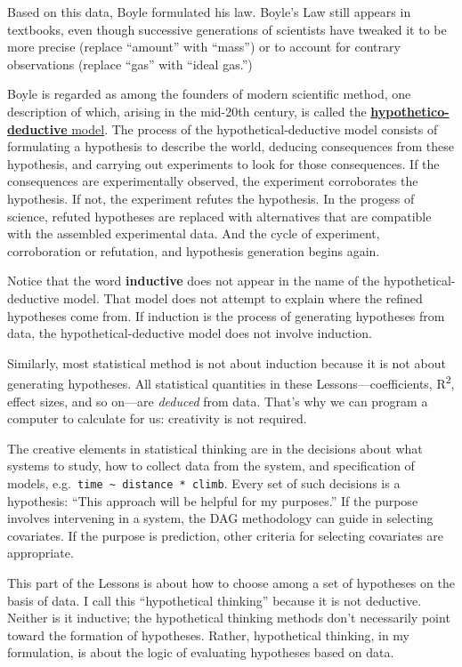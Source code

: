 \documentclass[
  letterpaper,
  DIV=11,
  numbers=noendperiod,
  oneside]{scrartcl}
\begin{document}
Based on this data, Boyle formulated his law. Boyle's Law still appears
in textbooks, even though successive generations of scientists have
tweaked it to be more precise (replace ``amount'' with ``mass'') or to
account for contrary observations (replace ``gas'' with ``ideal gas.'')

Boyle is regarded as among the founders of modern scientific method, one
description of which, arising in the mid-20th century, is called the
\href{https://en.wikipedia.org/wiki/Hypothetico-deductive_model}{\textbf{hypothetico-deductive}
model}. The process of the hypothetical-deductive model consists of
formulating a hypothesis to describe the world, deducing consequences
from these hypothesis, and carrying out experiments to look for those
consequences. If the consequences are experimentally observed, the
experiment corroborates the hypothesis. If not, the experiment refutes
the hypothesis. In the progess of science, refuted hypotheses are
replaced with alternatives that are compatible with the assembled
experimental data. And the cycle of experiment, corroboration or
refutation, and hypothesis generation begins again.

Notice that the word \textbf{inductive} does not appear in the name of
the hypothetical-deductive model. That model does not attempt to explain
where the refined hypotheses come from. If induction is the process of
generating hypotheses from data, the hypothetical-deductive model does
not involve induction.

Similarly, most statistical method is not about induction because it is
not about generating hypotheses. All statistical quantities in these
Lessons---coefficients, R\textsuperscript{2}, effect sizes, and so
on---are \emph{deduced} from data. That's why we can program a computer
to calculate for us: creativity is not required.

The creative elements in statistical thinking are in the decisions about
what systems to study, how to collect data from the system, and
specification of models,
e.g.~\texttt{time\ \textasciitilde{}\ distance\ *\ climb}. Every set of
such decisions is a hypothesis: ``This approach will be helpful for my
purposes.'' If the purpose involves intervening in a system, the DAG
methodology can guide in selecting covariates. If the purpose is
prediction, other criteria for selecting covariates are appropriate.

This part of the Lessons is about how to choose among a set of
hypotheses on the basis of data. I call this ``hypothetical thinking''
because it is not deductive. Neither is it inductive; the hypothetical
thinking methods don't necessarily point toward the formation of
hypotheses. Rather, hypothetical thinking, in my formulation, is about
the logic of evaluating hypotheses based on data.
\end{document}
